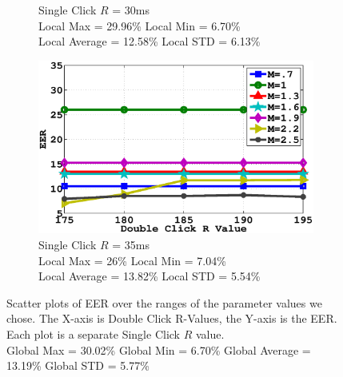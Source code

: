 \documentclass[conference]{IEEEtran}
\begin{document}
\begin{figure}
\begin{subfigure}{.5\textwidth}
  \caption{Single Click $R$ = 30ms \\Local Max = 29.96\% Local Min = 6.70\% \\Local Average = 12.58\% Local STD = 6.13\%}
  \label{fig:sfig3}
\end{subfigure}%
\begin{subfigure}{.5\textwidth}
  \centering
  \includegraphics[width=.8\linewidth]{35.eps}
  \caption{Single Click $R$ = 35ms \\Local Max = 26\% Local Min = 7.04\%\\Local Average = 13.82\% Local STD = 5.54\%}
  \label{fig:sfig4}
\end{subfigure}
\caption{Scatter plots of EER over the ranges of the parameter values we chose. The X-axis is Double Click R-Values, the Y-axis is the EER. Each plot is a separate Single Click $R$ value. \\Global Max = 30.02\% Global Min = 6.70\% Global Average = 13.19\% Global STD = 5.77\%}
\label{fig:eer}
\end{figure}
\end{document}
